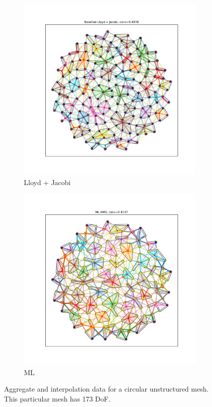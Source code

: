 \documentclass{article}
\begin{document}
\begin{figure}[h]
  \centering
  \begin{subfigure}[t]{0.49\textwidth}
    \centering
    \includegraphics[width=\textwidth]{grid_circle_lloyd.pdf}
    \caption{Lloyd + Jacobi}
  \end{subfigure}
  \begin{subfigure}[t]{0.49\textwidth}
    \centering
    \includegraphics[width=\textwidth]{grid_circle_ml.pdf}
    \caption{ML}
  \end{subfigure}
  \caption{Aggregate and interpolation data for a circular unstructured mesh.  This particular mesh has 173 DoF.}
  \label{fig:gridcircle}
\end{figure}
\end{document}
